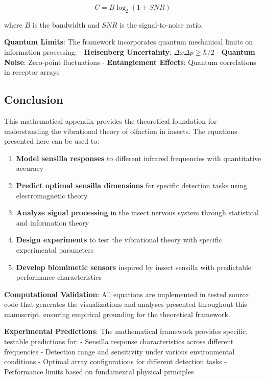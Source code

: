 \documentclass[
  13pt,
  a4paperpaper,
  12pt]{article}
\providecommand{\tightlist}{%
  \setlength{\itemsep}{0pt}\setlength{\parskip}{0pt}}
\begin{document}
\begin{equation}
C = B \log_2(1 + SNR)
\label{eq:channel_capacity_empirical}
\end{equation}

where \(B\) is the bandwidth and \(SNR\) is the signal-to-noise ratio.

\textbf{Quantum Limits}: The framework incorporates quantum mechanical
limits on information processing: - \textbf{Heisenberg Uncertainty}:
\(\Delta x \Delta p \geq \hbar/2\) - \textbf{Quantum Noise}: Zero-point
fluctuations - \textbf{Entanglement Effects}: Quantum correlations in
receptor arrays

\subsection{Conclusion}\label{conclusion}

This mathematical appendix provides the theoretical foundation for
understanding the vibrational theory of olfaction in insects. The
equations presented here can be used to:

\begin{enumerate}
\def\labelenumi{\arabic{enumi}.}
\tightlist
\item
  \textbf{Model sensilla responses} to different infrared frequencies
  with quantitative accuracy
\item
  \textbf{Predict optimal sensilla dimensions} for specific detection
  tasks using electromagnetic theory
\item
  \textbf{Analyze signal processing} in the insect nervous system
  through statistical and information theory
\item
  \textbf{Design experiments} to test the vibrational theory with
  specific experimental parameters
\item
  \textbf{Develop biomimetic sensors} inspired by insect sensilla with
  predictable performance characteristics
\end{enumerate}

\textbf{Computational Validation}: All equations are implemented in
tested source code that generates the visualizations and analyses
presented throughout this manuscript, ensuring empirical grounding for
the theoretical framework.

\textbf{Experimental Predictions}: The mathematical framework provides
specific, testable predictions for: - Sensilla response characteristics
across different frequencies - Detection range and sensitivity under
various environmental conditions - Optimal array configurations for
different detection tasks - Performance limits based on fundamental
physical principles
\end{document}
